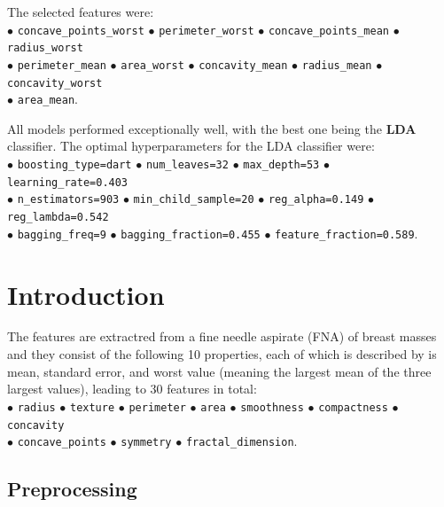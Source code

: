 \documentclass[12pt]{article}
\begin{document}
The selected features were:\\
$\bullet$ \texttt{concave\_points\_worst}
$\bullet$ \texttt{perimeter\_worst}
$\bullet$ \texttt{concave\_points\_mean}
$\bullet$ \texttt{radius\_worst} \\
$\bullet$ \texttt{perimeter\_mean}
$\bullet$ \texttt{area\_worst}
$\bullet$ \texttt{concavity\_mean}
$\bullet$ \texttt{radius\_mean}
$\bullet$ \texttt{concavity\_worst} \\
$\bullet$ \texttt{area\_mean}.

All models performed exceptionally well, with the best one being the
\textbf{LDA} classifier. The optimal hyperparameters for the LDA classifier
were: \\
$\bullet$ \texttt{boosting\_type=dart}
$\bullet$ \texttt{num\_leaves=32}
$\bullet$ \texttt{max\_depth=53}
$\bullet$ \texttt{learning\_rate=0.403} \\
$\bullet$ \texttt{n\_estimators=903}
$\bullet$ \texttt{min\_child\_sample=20}
$\bullet$ \texttt{reg\_alpha=0.149}
$\bullet$ \texttt{reg\_lambda=0.542} \\
$\bullet$ \texttt{bagging\_freq=9}
$\bullet$ \texttt{bagging\_fraction=0.455}
$\bullet$ \texttt{feature\_fraction=0.589}.




\section{Introduction}

The features are extractred from a fine needle aspirate (FNA) of breast masses
and they consist of the following 10 properties, each of which is described by
is mean, standard error, and worst value (meaning the largest mean of the three
largest values), leading to 30 features in total: \\
$\bullet$ \texttt{radius}
$\bullet$ \texttt{texture}
$\bullet$ \texttt{perimeter}
$\bullet$ \texttt{area}
$\bullet$ \texttt{smoothness}
$\bullet$ \texttt{compactness}
$\bullet$ \texttt{concavity} \\
$\bullet$ \texttt{concave\_points}
$\bullet$ \texttt{symmetry}
$\bullet$ \texttt{fractal\_dimension}.


\subsection{Preprocessing}
\end{document}

